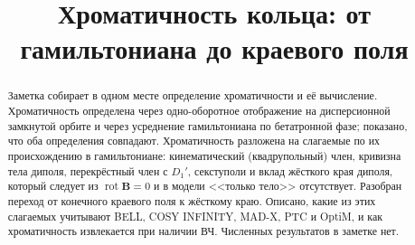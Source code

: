 \documentclass[a4paper,11pt]{article}
\title{Хроматичность кольца: от гамильтониана до краевого поля}
\author{}
\date{}
\begin{document}
\maketitle

\begin{abstract}
Заметка собирает в одном месте определение хроматичности и её вычисление. Хроматичность определена через одно-оборотное отображение на дисперсионной замкнутой орбите и через усреднение гамильтониана по бетатронной фазе; показано, что оба определения совпадают. Хроматичность разложена на слагаемые по их происхождению в гамильтониане: кинематический (квадрупольный) член, кривизна тела диполя, перекрёстный член с $D_1'$, секступоли и вклад жёсткого края диполя, который следует из $\operatorname{rot}\mathbf{B}=0$ и в модели <<только тело>> отсутствует. Разобран переход от конечного краевого поля к жёсткому краю. Описано, какие из этих слагаемых учитывают BELL, COSY INFINITY, MAD-X, PTC и OptiM, и как хроматичность извлекается при наличии ВЧ. Численных результатов в заметке нет.
\end{abstract}

\tableofcontents

\clearpage








\clearpage
\appendix


\clearpage


\end{document}
